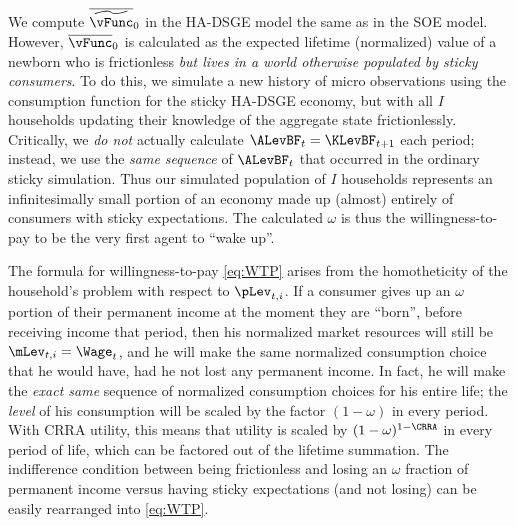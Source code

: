 We compute $\overline{\widetilde{\vFunc}}_0$ in the HA-DSGE model the same as in the SOE
model.  However, $\overline{\vFunc}_0$ is calculated as the expected lifetime (normalized) value
of a newborn who is frictionless \textit{but lives in a world otherwise populated by sticky consumers}. To do
this, we simulate a new history of micro observations using the consumption function for the
sticky HA-DSGE economy, but with all $I$ households updating their knowledge of the aggregate
state frictionlessly.  Critically, we \textit{do not} actually calculate $\ALevBF_t = \KLevBF_{t+1}$
each period; instead, we use the \textit{same sequence} of $\ALevBF_t$ that occurred in the
ordinary sticky simulation.  Thus our simulated population of $I$ households represents an infinitesimally
small portion of an economy made up (almost) entirely of consumers with sticky expectations.  The
calculated $\omega$ is thus the willingness-to-pay to be the very first agent to ``wake up''.

The formula for willingness-to-pay \eqref{eq:WTP} arises from the homotheticity of the household's
problem with respect to $\pLev_{t,i}$.  If a consumer gives up an $\omega$ portion of their permanent
income at the moment they are ``born'', before receiving income that period, then his normalized market
resources will still be $\mLev_{t,i} = \Wage_t$, and he will make the same normalized consumption
choice that he would have, had he not lost any permanent income.  In fact, he will make the \textit{exact same}
sequence of normalized consumption choices for his entire life; the \textit{level} of his consumption will
be scaled by the factor $(1-\omega)$ in every period.  With CRRA utility, this means that utility is scaled
by $(1-\omega)^{1-\CRRA}$ in every period of life, which can be factored out of the lifetime summation.
The indifference condition between being frictionless and losing an $\omega$ fraction of permanent income
versus having sticky expectations (and not losing) can be easily rearranged into \eqref{eq:WTP}.
